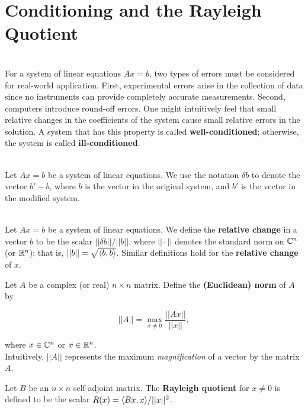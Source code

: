 \section{Conditioning and the Rayleigh Quotient}

\begin{definition}
	\hfill\\
	For a system of linear equations $Ax = b$, two types of errors must be considered for real-world application. First, experimental errors arise in the collection of data since no instruments can provide completely accurate measurements. Second, computers introduce round-off errors. One might intuitively feel that small relative changes in the coefficients of the system cause small relative errors in the solution. A system that has this property is called \textbf{well-conditioned}; otherwise, the system is called \textbf{ill-conditioned}.
\end{definition}

\begin{notation}
	\hfill\\
	Let $Ax = b$ be a system of linear equations. We use the notation $\delta b$ to denote the vector $b' - b$, where $b$ is the vector in the original system, and $b'$ is the vector in the modified system.
\end{notation}

\begin{definition}
	\hfill\\
	Let $Ax = b$ be a system of linear equations. We define the \textbf{relative change} in a vector $b$ to be the scalar $||\delta b||/ ||b||$, where $|| \cdot ||$ denotes the standard norm on $\mathbb{C}^n$ (or $\mathbb{R}^n$); that is, $||b|| = \sqrt{\langle b, b\rangle}$. Similar definitions hold for the \textbf{relative change} of $x$.
\end{definition}

\begin{definition}
	Let $A$ be a complex (or real) $n \times n$ matrix. Define the \textbf{(Euclidean) norm} of $A$ by

	\[||A|| = \max_{x \neq 0} \frac{||Ax||}{||x||},\]

	where $x \in \mathbb{C}^n$ or $x \in \mathbb{R}^n$.\\

	Intuitively, $||A||$ represents the maximum \textit{magnification} of a vector by the matrix $A$.
\end{definition}

\begin{definition}
	Let $B$ be an $n \times n$ self-adjoint matrix. The \textbf{Rayleigh quotient} for $x \neq 0$ is defined to be the scalar $R(x) = \langle Bx, x\rangle/ ||x||^2$.
\end{definition}

